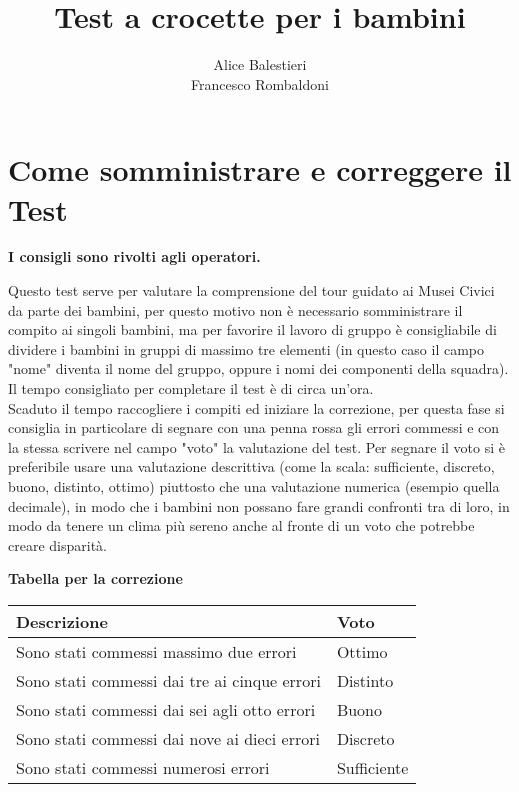 \documentclass[hidelinks,12pt,a4paper]{exam}
\begin{document}
	
	\title{\textbf{Test a crocette per i bambini}}
	\author{Alice Balestieri\\Francesco Rombaldoni}
	\date{}
	\maketitle
	
	\newpage
	\pagestyle{plain}
	\tableofcontents
	\newpage
	
	\section{Come somministrare e correggere il Test}
	\begin{center}
		\textbf{I consigli sono rivolti agli operatori.}
	\end{center}
	
	Questo test serve per valutare la comprensione del tour guidato ai Musei Civici da parte dei bambini, per questo motivo non è necessario somministrare il compito ai singoli bambini, ma per favorire il lavoro di gruppo è consigliabile di dividere i bambini in gruppi di massimo tre elementi (in questo caso il campo "nome" diventa il nome del gruppo, oppure i nomi dei componenti della squadra). Il tempo consigliato per completare il test è di circa un'ora.\\
	Scaduto il tempo raccogliere i compiti ed iniziare la correzione, per questa fase si consiglia in particolare di segnare con una penna rossa gli errori commessi e con la stessa scrivere nel campo "voto" la valutazione del test. Per segnare il voto si è preferibile usare una valutazione descrittiva (come la scala: sufficiente, discreto, buono, distinto, ottimo) piuttosto che una valutazione numerica (esempio quella decimale), in modo che i bambini non possano fare grandi confronti tra di loro, in modo da tenere un clima più sereno anche al fronte di un voto che potrebbe creare disparità.\\
	
	\begin{center}
		\large{\textbf{Tabella per la correzione}}\\
		\bigskip
		
		\begin{tabularx}{0.5\textwidth} { 
				| >{\raggedright\arraybackslash}X 
				| >{\centering\arraybackslash}X | }
			\hline
			\textbf{Descrizione} & \textbf{Voto} \\
			\hline
			Sono stati commessi massimo due errori & Ottimo\\
			\hline
			Sono stati commessi dai tre ai cinque errori & Distinto\\
			\hline
			Sono stati commessi dai sei agli otto errori & Buono\\
			\hline
			Sono stati commessi dai nove ai dieci errori & Discreto\\
			\hline
			Sono stati commessi numerosi errori & Sufficiente\\
			\hline
		\end{tabularx}
	\end{center}
	
\end{document}
